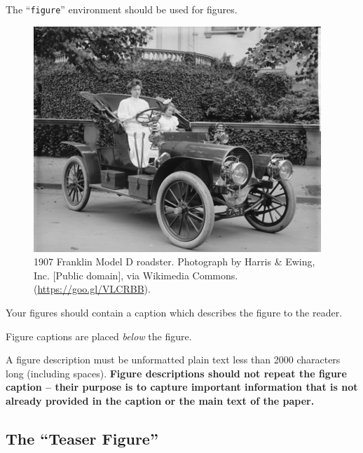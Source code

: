 The ``\verb|figure|'' environment should be used for figures.
\begin{figure}[h]
  \centering
  \includegraphics[width=\linewidth]{template_files/sample-franklin}
  \caption{1907 Franklin Model D roadster. Photograph by Harris \&
    Ewing, Inc. [Public domain], via Wikimedia
    Commons. (\url{https://goo.gl/VLCRBB}).}
\end{figure}

Your figures should contain a caption which describes the figure to
the reader.

Figure captions are placed {\itshape below} the figure.



A figure description must be unformatted plain text less than 2000
characters long (including spaces).  {\bfseries Figure descriptions
  should not repeat the figure caption – their purpose is to capture
  important information that is not already provided in the caption or
  the main text of the paper.} 

\subsection{The ``Teaser Figure''}

